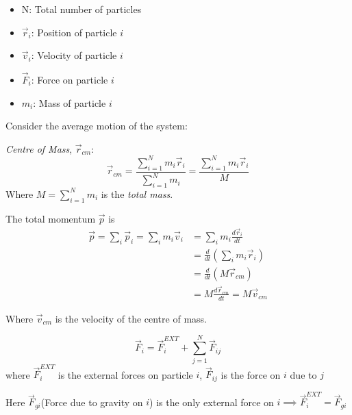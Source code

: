 \documentclass[10pt]{scrartcl}
\begin{document}



\begin{definition}
\begin{itemize}
\item N: Total number of particles
\item $\vec{r}_i$: Position of particle $i$
\item $\vec{v}_i$: Velocity of particle $i$
\item $\vec{F}_i$: Force on particle $i$
 \item $m_i$: Mass of particle $i$
\end{itemize}	
\end{definition}

\vspace*{60pt}

Consider the average motion of the system:

\begin{definition}
\emph{Centre of Mass}, $\vec{r}_{cm}$:
\[\vec{r}_{cm} = \frac{\sum_{i=1}^Nm_i\vec{r}_i}{\sum_{i=1}^Nm_i} =\frac{\sum_{i=1}^Nm_i\vec{r}_i}{M}  \]
Where $M = \sum_{i=1}^Nm_i$ is the \emph{total mass}. 	
\end{definition}


The total momentum $\vec{p}$ is
\[\begin{aligned}\vec{p} = \sum_i\vec{p}_i = \sum_im_i\vec{v}_i &= \sum_i m_i\frac{d\vec{r}_i}{dt} \\
 &= \frac{d}{dt}(\sum_i m_i\vec{r}_i) \\
 &= \frac{d}{dt}(M\vec{r}_{cm}) \\
 &= M\frac{d\vec{r}_{cm}}{dt} = M\vec{v}_{cm}
\end{aligned}
\]

Where $\vec{v}_{cm}$ is the velocity of the centre of mass.


\[\vec{F}_i = \vec{F}_i^{EXT} + \sum_{j=1}^N \vec{F}_{ij}\]
where $\vec{F}_i^{EXT}$ is the external forces on particle $i$, $\vec{F}_{ij}$ is the force on $i$ due to $j$
\begin{example}
\vspace*{45pt}

Here $\vec{F}_{gi}$(Force due to gravity on $i$) is the only external force on $i \implies \vec{F}_i^{EXT} = \vec{F}_{gi}$
	
\end{example}
\end{document}
